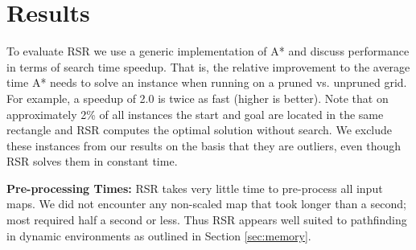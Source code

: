 \section{Results}
\label{sec-results}
To evaluate RSR we use a generic implementation of A* and discuss performance 
in terms of search time speedup. That is, the relative improvement to the average 
time A* needs to solve an instance when running on a pruned  vs. unpruned grid.
For example, a speedup of 2.0 is twice as fast (higher is better).
%
Note that on approximately 2\% of all instances the start and goal are located
in the same rectangle and RSR computes the optimal solution without
search.  We exclude these instances from our results on the basis that they are 
outliers, even though RSR solves them in constant time.



\textbf{Pre-processing Times: } 
RSR takes very little time to pre-process all input maps. 
We did not encounter any non-scaled map that took longer than a second; most required 
half a second or less.
Thus RSR appears well suited to
pathfinding in dynamic environments as outlined in Section \ref{sec:memory}.

